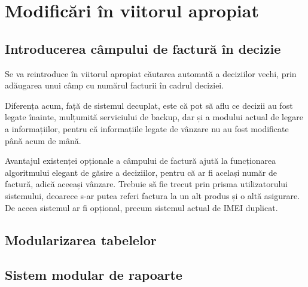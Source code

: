 \section{Modificări în viitorul apropiat}

	\subsection{Introducerea câmpului de factură în decizie}

	Se va reintroduce în viitorul apropiat căutarea automată a deciziilor vechi, prin adăugarea unui câmp cu numărul facturii în cadrul deciziei.

	Diferența acum, față de sistemul decuplat, este că pot să aflu ce decizii au fost legate înainte, mulțumită serviciului de backup, dar și a modului actual de legare a informațiilor, pentru că informațiile legate de vânzare nu au fost modificate până acum de mână.

	Avantajul existenței opționale a câmpului de factură ajută la funcționarea algoritmului elegant de găsire a deciziilor, pentru că ar fi același număr de factură, adică aceeași vânzare.
	Trebuie să fie trecut prin prisma utilizatorului sistemului, deoarece s-ar putea referi factura la un alt produs și o altă asigurare.
	De aceea sistemul ar fi opțional, precum sistemul actual de IMEI duplicat.

	\subsection{Modularizarea tabelelor}

	\subsection{Sistem modular de rapoarte}
